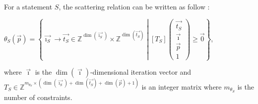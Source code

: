 \documentclass[paper=a4, fontsize=11pt]{scrartcl}
\numberwithin{equation}{section}        %
\numberwithin{figure}{section}          %
\numberwithin{table}{section}               %
\begin{document}
                For a statement $S$, the scattering relation can be written as follow :
                \begin{center}
                    $\theta_S(\vec{p}) = \left\{\vec{\imath_S} \to \vec{t_S} \in \mathbb{Z}^{\dim(\vec{\imath_S})}\times\mathbb{Z}^{\dim(\vec{t_S})}
                    \middle|
                    \left[T_S\right]\begin{pmatrix}\vec{t_S}\\ \vec{\imath} \\ \vec{p} \\ 1\end{pmatrix}
                    \geq \vec{0}
                    \right\}$,
                \end{center}
                where $\vec{\imath}$ is the $\dim(\vec{\imath})$-dimensional iteration vector
                and $T_S \in \mathbb{Z}^{m_{\theta_S}\times(\dim(\vec{\imath_S})+\dim(\vec{t_S})+\dim(\vec{p})+1)}$
                is an integer matrix where $m_{\theta_S}$ is the number of constraints.
\end{document}

